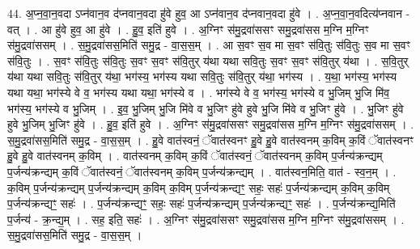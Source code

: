 \documentclass[17pt]{extarticle}
\begin{document}
44. अ॒प्न॒वा॒न॒वदा ऽप्न॑वान॒व द॑प्नवान॒वदा हु॑वे हुव॒ आ ऽप्न॑वान॒व द॑प्नवान॒वदा हु॑वे । . अ॒प्न॒वा॒न॒वदित्य॑प्नवान - वत् । . आ हु॑वे हुव॒ आ हु॑वे । . हु॒व॒ इति॑ हुवे । . अ॒ग्निꣳ स॑मु॒द्रवा॑ससꣳ समु॒द्रवा॑सस म॒ग्नि म॒ग्निꣳ स॑मु॒द्रवा॑ससम् । . स॒मु॒द्रवा॑सस॒मिति॑ समु॒द्र - वा॒स॒स॒म् । . आ स॒वꣳ स॒व मा स॒वꣳ स॑वि॒तुः स॑वि॒तुः स॒व मा स॒वꣳ स॑वि॒तुः । . स॒वꣳ स॑वि॒तुः स॑वि॒तुः स॒वꣳ स॒वꣳ स॑वि॒तुर् य॑था यथा सवि॒तुः स॒वꣳ स॒वꣳ स॑वि॒तुर् य॑था । . स॒वि॒तुर् य॑था यथा सवि॒तुः स॑वि॒तुर् य॑था॒ भग॑स्य॒ भग॑स्य यथा सवि॒तुः स॑वि॒तुर् य॑था॒ भग॑स्य । . य॒था॒ भग॑स्य॒ भग॑स्य यथा यथा॒ भग॑स्ये वे व॒ भग॑स्य यथा यथा॒ भग॑स्ये व । . भग॑स्ये वे व॒ भग॑स्य॒ भग॑स्ये व भु॒जिम् भु॒जि मि॑व॒ भग॑स्य॒ भग॑स्ये व भु॒जिम् । . इ॒व॒ भु॒जिम् भु॒जि मि॑वे व भु॒जिꣳ हु॑वे हुवे भु॒जि मि॑वे व भु॒जिꣳ हु॑वे । . भु॒जिꣳ हु॑वे हुवे भु॒जिम् भु॒जिꣳ हु॑वे । . हु॒व॒ इति॑ हुवे । . अ॒ग्निꣳ स॑मु॒द्रवा॑ससꣳ समु॒द्रवा॑सस म॒ग्नि म॒ग्निꣳ स॑मु॒द्रवा॑ससम् । . स॒मु॒द्रवा॑सस॒मिति॑ समु॒द्र - वा॒स॒स॒म् । . हु॒वे वात॑स्वनं॒ ॅवात॑स्वनꣳ हु॒वे हु॒वे वात॑स्वनम् क॒विम् क॒विं ॅवात॑स्वनꣳ हु॒वे हु॒वे वात॑स्वनम् क॒विम् । . वात॑स्वनम् क॒विम् क॒विं ॅवात॑स्वनं॒ ॅवात॑स्वनम् क॒विम् प॒र्जन्य॑क्रन्द्यम् प॒र्जन्य॑क्रन्द्यम् क॒विं ॅवात॑स्वनं॒ ॅवात॑स्वनम् क॒विम् प॒र्जन्य॑क्रन्द्यम् । . वात॑स्वन॒मिति॒ वात॑ - स्व॒न॒म् । . क॒विम् प॒र्जन्य॑क्रन्द्यम् प॒र्जन्य॑क्रन्द्यम् क॒विम् क॒विम् प॒र्जन्य॑क्रन्द्यꣳ॒॒ सहः॒ सहः॑ प॒र्जन्य॑क्रन्द्यम् क॒विम् क॒विम् प॒र्जन्य॑क्रन्द्यꣳ॒॒ सहः॑ । . प॒र्जन्य॑क्रन्द्यꣳ॒॒ सहः॒ सहः॑ प॒र्जन्य॑क्रन्द्यम् प॒र्जन्य॑क्रन्द्यꣳ॒॒ सहः॑ । . प॒र्जन्य॑क्रन्द्य॒मिति॑ प॒र्जन्य॑ - क्र॒न्द्य॒म् । . सह॒ इति॒ सहः॑ । . अ॒ग्निꣳ स॑मु॒द्रवा॑ससꣳ समु॒द्रवा॑सस म॒ग्नि म॒ग्निꣳ स॑मु॒द्रवा॑ससम् । . स॒मु॒द्रवा॑सस॒मिति॑ समु॒द्र - वा॒स॒स॒म् । \newline
\pagebreak
\end{document}
